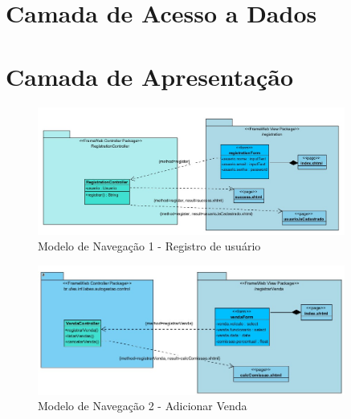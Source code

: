 \section{Camada de Acesso a Dados}
\label{sec-frameweb-dados}

\section{Camada de Apresentação}
\begin{figure}
    \centering
    \includegraphics[width=0.9\textwidth]{figuras/Modelo de Navegacao 1.jpg}
    \caption{Modelo de Navegação 1 - Registro de usuário}
    \label{Modelo de Navegacao 1.jpg}
\end{figure}
\begin{figure}
    \centering
    \includegraphics[width=0.9\textwidth]{figuras/Modelo de Navegacao 2.jpg}
    \caption{Modelo de Navegação 2 - Adicionar Venda}
    \label{Modelo de Navegacao 2.jpg}
\end{figure}